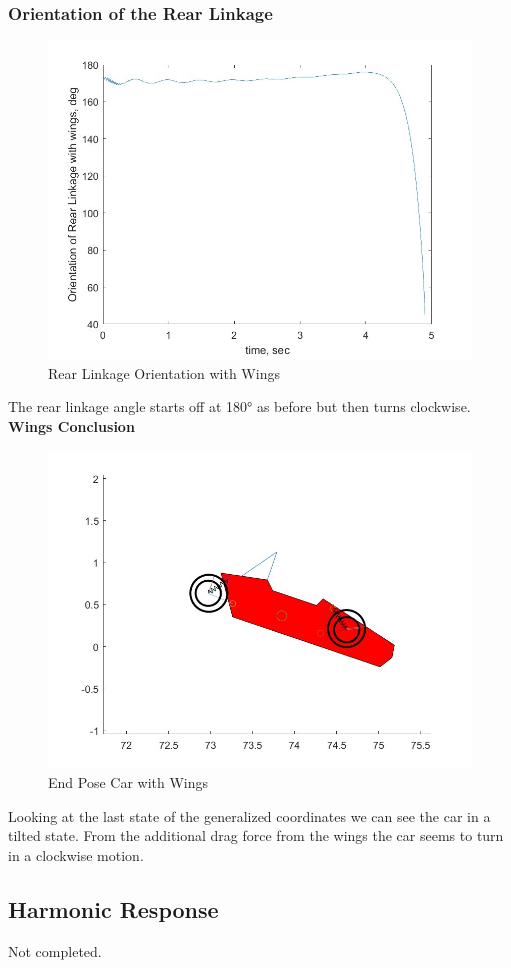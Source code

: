 \subsubsection{Orientation of the Rear Linkage}
\begin{figure}[ht]
    \centering
    \includegraphics[scale=0.35]{images/rear_linkage_angle_with_wings.jpg}
    \caption{Rear Linkage Orientation with Wings}
    \label{fig:rear_linkage_wings}
\end{figure}
The rear linkage angle starts off at 180° as before but then turns clockwise.
\clearpage
\textbf{Wings Conclusion}
\begin{figure}[ht]
    \centering
    \includegraphics[scale=0.35]{images/end_position_wings.jpg}
    \caption{End Pose Car with Wings}
    \label{fig:end_position_wings}
\end{figure}
Looking at the last state of the generalized coordinates we can see the car in a tilted state. From the additional drag force from the wings the car seems to turn in a clockwise motion.
\subsection{Harmonic Response}
Not completed.

